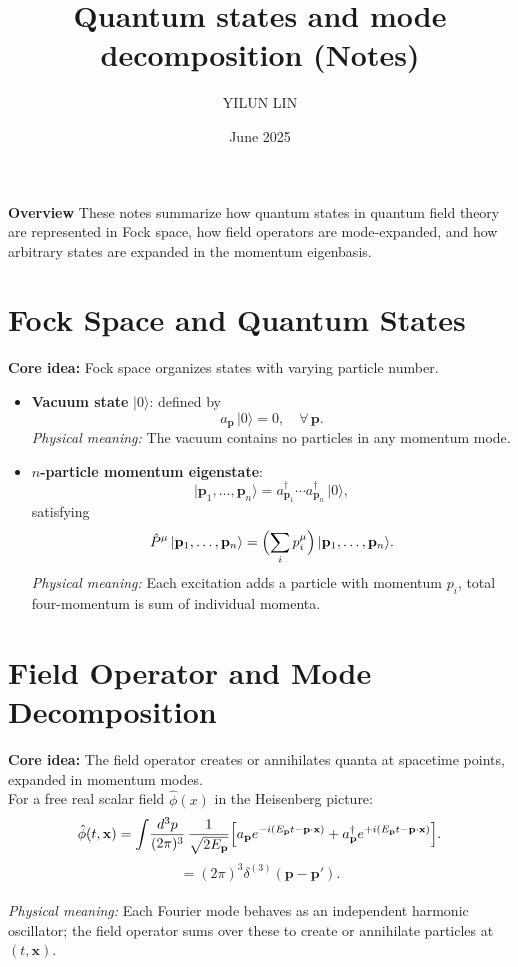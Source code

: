 \documentclass[11pt]{article}
\title{Quantum states and mode decomposition (Notes)}
\author{YILUN LIN}
\date{June 2025}
\numberwithin{equation}{section}
\begin{document}
\maketitle
\Large\textbf{Overview}
\newline
\Large{These notes summarize how quantum states in quantum field theory are represented in Fock space, how field operators are mode-expanded, and how arbitrary states are expanded in the momentum eigenbasis.}

\section{Fock Space and Quantum States}
\textbf{Core idea:} Fock space organizes states with varying particle number. \\
\begin{itemize}
 \item\textbf{Vacuum state}  $\lvert0\rangle$: defined by
 \begin{equation}
 a_{\mathbf p}\, \lvert0\rangle = 0,\quad \forall\, \mathbf p.
 \end{equation}
 \textit{Physical meaning:} The vacuum contains no particles in any momentum mode.
 \item \textbf{$n$-particle momentum eigenstate}:
 \begin{equation}
 \lvert \mathbf p_1, \dots,\mathbf p_n\rangle = a_{\mathbf p_1}^\dagger\cdots 
 a_{\mathbf p_n}^\dagger\,\lvert0\rangle,
 \end{equation}
 satisfying
 \begin{equation}
 \hat P^\mu\, \lvert \mathbf p_1, \dots,\mathbf p_n\rangle = \Bigl(\sum_i p_i^\mu\Bigr)\,\lvert \mathbf p_1,\dots,\mathbf p_n\rangle.
 \end{equation}
 \textit{Physical meaning:} Each excitation adds a particle with momentum $p_i$,
 total four-momentum is sum of individual momenta.
\\[1em]
\end{itemize}

\section{Field Operator and Mode Decomposition}
\textbf{Core idea:} The field operator creates or annihilates quanta at spacetime points, expanded in momentum modes. \\[1em]
For a free real scalar field $\hat\phi(x)$ in the Heisenberg picture:
\begin{equation}
   \hat\phi(t,\mathbf x) = \int\!\frac{d^3p}{(2\pi)^3}\, \frac{1}{\sqrt{2E_{\mathbf p}}}\Bigl[a_{\mathbf p} e^{-i(E_{\mathbf p}t-\mathbf p\cdot\mathbf x)} + a_{\mathbf p}^\dagger e^{+i(E_{\mathbf p}t-\mathbf p \cdot \mathbf x)}\Bigr]. 
\end{equation}   
\begin{equation}
   [a_{\mathbf p}, \, a_{\mathbf p'}^\dagger] = (2\pi)^3 \delta^{(3)} (\mathbf p-\mathbf p').
\end{equation}
\\[1em]
\textit{Physical meaning:} Each Fourier mode behaves as an independent harmonic oscillator; the field operator sums over these to create or annihilate particles at $(t,\mathbf x)$.
\\[1em]
\end{document}
